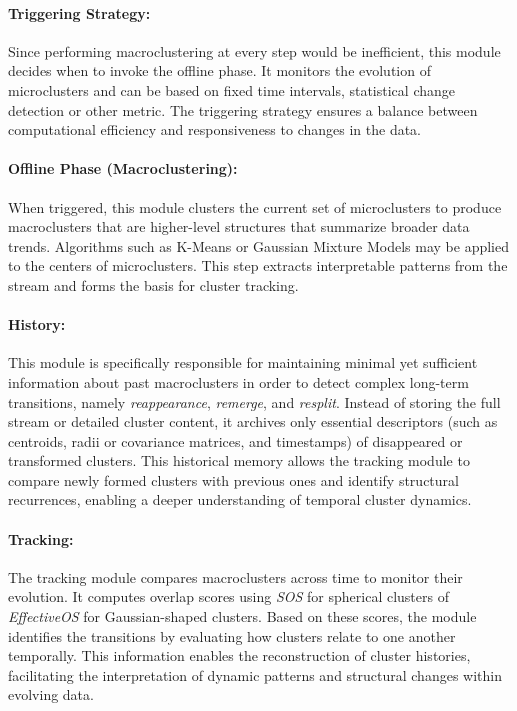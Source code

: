 \paragraph{Triggering Strategy:} Since performing macroclustering at every step would be inefficient, this
module decides when to invoke the offline phase. It monitors the evolution of
microclusters and can be based on fixed time intervals, statistical change
detection or other metric. The triggering strategy ensures a balance between
computational efficiency and responsiveness to changes in the data.

\paragraph{Offline Phase (Macroclustering):} When triggered, this module clusters the current set of microclusters to
produce macroclusters that are higher-level structures that summarize broader
data trends. Algorithms such as K-Means or Gaussian Mixture Models may be
applied to the centers of microclusters. This step extracts interpretable
patterns from the stream and forms the basis for cluster tracking.

\paragraph{History:} This module is specifically responsible for maintaining minimal yet sufficient
information about past macroclusters in order to detect complex long-term
transitions, namely \emph{reappearance}, \emph{remerge}, and \emph{resplit}.
Instead of storing the full stream or detailed cluster content, it archives
only essential descriptors (such as centroids, radii or covariance matrices,
and timestamps) of disappeared or transformed clusters. This historical memory
allows the tracking module to compare newly formed clusters with previous ones
and identify structural recurrences, enabling a deeper understanding of
temporal cluster dynamics.

\paragraph{Tracking:} The tracking module compares macroclusters across time to monitor their
evolution. It computes overlap scores using \emph{SOS} for spherical clusters
of \emph{EffectiveOS} for Gaussian-shaped clusters. Based on these scores, the
module identifies the transitions by evaluating how clusters relate to one
another temporally. This information enables the reconstruction of cluster
histories, facilitating the interpretation of dynamic patterns and structural
changes within evolving data.

